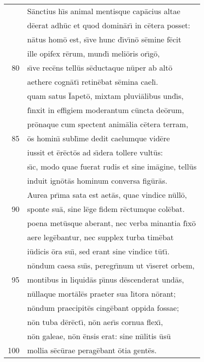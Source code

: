 \documentclass[paper=6in:9in,pagesize=pdftex,
               headinclude=on,footinclude=on,12pt]{scrbook}
\begin{document}
\begin{longtable}[p]{ r l }
 & \indent S\=anctius h\={\i}s animal mentisque cap\=acius altae\\ 
 & d\=eerat adh\=uc et quod domin\=ar\={\i} in c\=etera posset:\\ 
 & n\=atus hom\=o est, s\={\i}ve hunc d\={\i}v\={\i}n\=o s\=emine f\=ecit\\ 
 & ille opifex r\=erum, mund\={\i} meli\=oris or\={\i}g\=o,\\ 
80 & s\={\i}ve rec\=ens tell\=us s\=eductaque n\=uper ab alt\=o\\ 
 & aethere cogn\=at\={\i} retin\=ebat s\=emina cael\={\i}.\\ 
 & quam satus \=Iapet\=o, mixtam pluvi\=alibus und\={\i}s,\\ 
 & f\={\i}nxit in effigiem moderantum c\=uncta de\=orum,\\ 
 & pr\=onaque cum spectent anim\=alia c\=etera terram,\\ 
85 & \=os homin\={\i} subl\={\i}me dedit caelumque vid\=ere\\ 
 & iussit et \=er\=ect\=os ad s\={\i}dera tollere vult\=us:\\ 
 & s\={\i}c, modo quae fuerat rudis et sine im\=agine, tell\=us\\ 
 & induit ign\=ot\=as hominum conversa fig\=ur\=as.\\ 
 & \indent Aurea pr\={\i}ma sata est aet\=as, quae vindice n\=ull\=o,\\ 
90 & sponte su\=a, sine l\=ege fidem r\=ectumque col\=ebat.\\ 
 & poena met\=usque aberant, nec verba minantia f\={\i}x\=o\\ 
 & aere leg\=ebantur, nec supplex turba tim\=ebat\\ 
 & i\=udicis \=ora su\={\i}, sed erant sine vindice t\=ut\={\i}.\\ 
 & n\=ondum caesa su\={\i}s, peregr\={\i}num ut v\={\i}seret orbem,\\ 
95 & montibus in liquid\=as p\={\i}nus d\=escenderat und\=as,\\ 
 & n\=ullaque mort\=al\=es praeter sua l\={\i}tora n\=orant;\\ 
 & n\=ondum praecipit\=es cing\=ebant oppida fossae;\\ 
 & n\=on tuba d\=er\=ect\={\i}, n\=on aer\={\i}s cornua flex\={\i},\\ 
 & n\=on galeae, n\=on \=ensis erat: sine m\={\i}litis \=us\=u\\ 
100 & mollia s\=ec\=urae perag\=ebant \=otia gent\=es.\\ 

\end{longtable}
\end{document}

